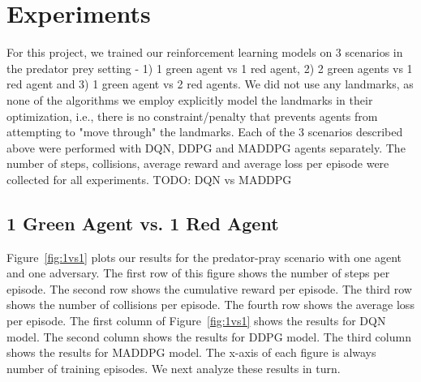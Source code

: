 
\section{Experiments}
\label{sec:experiment}

For this project, we trained our reinforcement learning models on 3 scenarios in the predator prey setting - 1) 1 green agent vs 1 red agent, 2) 2 green agents vs 1 red agent and 3) 1 green agent vs 2 red agents. We did not use any landmarks, as none of the algorithms we employ explicitly model the landmarks in their optimization, i.e., there is no constraint/penalty that prevents agents from attempting to "move through" the landmarks. Each of the 3 scenarios described above were performed with DQN, DDPG and MADDPG agents separately. The number of steps, collisions, average reward and average loss per episode were collected for all experiments. TODO: DQN vs MADDPG  

\subsection{1 Green Agent vs. 1 Red Agent}
\label{sec:experiment:1vs1}

Figure~\ref{fig:1vs1} plots our results for the predator-pray scenario with one
agent and one adversary. The first row of this figure shows the number of steps
per episode. The second row shows the cumulative reward per episode. The third
row shows the number of collisions per episode. The fourth row shows the
average loss per episode. The first column of Figure~\ref{fig:1vs1} shows the
results for DQN model. The second column shows the results for DDPG model. The
third column shows the results for MADDPG model. The x-axis of each figure is
always number of training episodes. We next analyze these results in turn.

